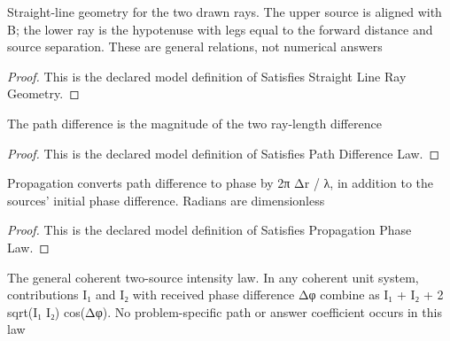 \begin{definition}
  \label{def:physics:phyx-mini-0246:phyxminiproblems-problemphyxmini0246-satisfiesstraightlineraygeometry}
  Straight-line geometry for the two drawn rays. The upper source is aligned with B; the lower ray is the hypotenuse with legs equal to the forward distance and source separation. These are general relations, not numerical answers
\end{definition}
\begin{proof}
  This is the declared model definition of Satisfies Straight Line Ray Geometry.
\end{proof}
\begin{definition}
  \label{def:physics:phyx-mini-0246:phyxminiproblems-problemphyxmini0246-satisfiespathdifferencelaw}
  The path difference is the magnitude of the two ray-length difference
\end{definition}
\begin{proof}
  This is the declared model definition of Satisfies Path Difference Law.
\end{proof}
\begin{definition}
  \label{def:physics:phyx-mini-0246:phyxminiproblems-problemphyxmini0246-satisfiespropagationphaselaw}
  Propagation converts path difference to phase by 2π Δr / λ, in addition to the sources' initial phase difference. Radians are dimensionless
\end{definition}
\begin{proof}
  This is the declared model definition of Satisfies Propagation Phase Law.
\end{proof}
\begin{definition}
  \label{def:physics:phyx-mini-0246:phyxminiproblems-problemphyxmini0246-satisfiescoherenttwosourceinterferencelaw}
  The general coherent two-source intensity law. In any coherent unit system, contributions I₁ and I₂ with received phase difference Δφ combine as I₁ + I₂ + 2 sqrt(I₁ I₂) cos(Δφ). No problem-specific path or answer coefficient occurs in this law
\end{definition}
